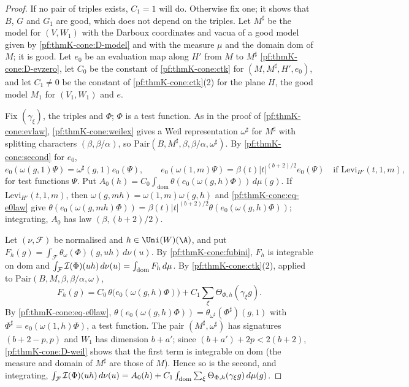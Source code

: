 \begin{proof}
If no pair of triples exists, $C_1=1$ will do.  Otherwise fix one; it shows that $B$, $G$ and $G_1$ are good, which does
not depend on the triples.  Let $M^\sharp$ be the model for $(V,W_1)$ with the Darboux coordinates and vacua of a good
model given by \ref{pf:thmK-cone:D-model} and with the measure $\mu$ and the domain $\mathrm{dom}$ of $M$; it is good.  Let
$e_0$ be an evaluation map along $H'$ from $M$ to $M^\sharp$ \ref{pf:thmK-cone:D-evzero}, let $C_0$ be the constant of
\cref{pf:thmK-cone:ctk} for $(M,M^\sharp,H',e_0)$, and let $C_1\neq0$ be the constant of
\cref{pf:thmK-cone:ctk}(2) for the plane $H$, the good model $M_1$ for $(V_1,W_1)$ and $e$.

Fix $(\gamma_\xi)$, the triples and $\Phi$; $\Phi$ is a test function.  As in the proof of \cref{pf:thmK-cone:evlaw},
\cref{pf:thmK-cone:weilex} gives a Weil representation $\omega^\sharp$ for $M^\sharp$ with splitting characters
$(\beta,\beta/\alpha)$, so $\mathrm{Pair}(B,M^\sharp,\beta,\beta/\alpha,\omega^\sharp)$.  By \cref{pf:thmK-cone:second} for
$e_0$,
\begin{equation}\label{pf:thmK-cone:eq-e0law}
  e_0(\omega(g,1)\Psi)=\omega^\sharp(g,1)e_0(\Psi),\qquad
  e_0(\omega(1,m)\Psi)=\beta(t)|t|^{(b+2)/2}e_0(\Psi)\quad\text{if }\mathrm{Levi}_{H'}(t,1,m),
\end{equation}
for test functions $\Psi$.  Put $A_0(h)=C_0\int_{\mathrm{dom}}\theta(e_0(\omega(g,h)\Phi))\,d\mu(g)$.  If
$\mathrm{Levi}_{H'}(t,1,m)$, then $\omega(g,mh)=\omega(1,m)\omega(g,h)$ and \eqref{pf:thmK-cone:eq-e0law} give
$\theta(e_0(\omega(g,mh)\Phi))=\beta(t)|t|^{(b+2)/2}\theta(e_0(\omega(g,h)\Phi))$; integrating, $A_0$ has law
$(\beta,(b+2)/2)$.

Let $(\nu,\mathcal F)$ be normalised and $h\in\Uni(W)(\A)$, and put $F_h(g)=\int_{\mathcal F}\theta_\omega(\Phi)(g,uh)\,d\nu(u)$.
By \cref{pf:thmK-cone:fubini}, $F_h$ is integrable on $\mathrm{dom}$ and $\int_{\mathcal F}\mathcal{I}(\Phi)(uh)\,d\nu(u)=
\int_{\mathrm{dom}}F_h\,d\mu$.  By \cref{pf:thmK-cone:ctk}(2), applied to $\mathrm{Pair}(B,M,\beta,\beta/\alpha,\omega)$,
\[
  F_h(g)=C_0\,\theta\bigl(e_0(\omega(g,h)\Phi)\bigr)+C_1\sum_\xi\Theta_{\Phi,h}(\gamma_\xi g).
\]
By \eqref{pf:thmK-cone:eq-e0law}, $\theta(e_0(\omega(g,h)\Phi))=\theta_{\omega^\sharp}(\Phi^\sharp)(g,1)$ with
$\Phi^\sharp=e_0(\omega(1,h)\Phi)$, a test function.  The pair $(M^\sharp,\omega^\sharp)$ has signatures $(b+2-p,p)$ and
$W_1$ has dimension $b+a'$; since $(b+a')+2p<2(b+2)$, \ref{pf:thmK-cone:D-weil} shows that the first term is integrable on
$\mathrm{dom}$ (the measure and domain of $M^\sharp$ are those of $M$).  Hence so is the second, and integrating,
$\int_{\mathcal F}\mathcal{I}(\Phi)(uh)\,d\nu(u)=A_0(h)+C_1\int_{\mathrm{dom}}\sum_\xi\Theta_{\Phi,h}(\gamma_\xi g)\,d\mu(g)$.
\end{proof}

